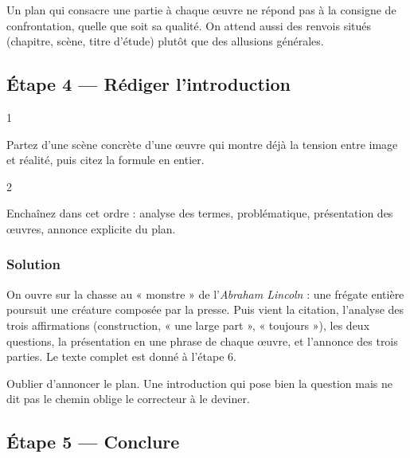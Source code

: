 \documentclass[11pt,a4paper]{article}
\begin{document}
\begin{jury}

Un plan qui consacre une partie à chaque œuvre ne répond pas à la consigne de confrontation, quelle que soit sa qualité. On attend aussi des renvois situés (chapitre, scène, titre d'étude) plutôt que des allusions générales.

\end{jury}

\hypertarget{uxe9tape-4-ruxe9diger-lintroduction}{%
\subsection{Étape 4 --- Rédiger l'introduction}\label{uxe9tape-4-ruxe9diger-lintroduction}}

\begin{indication}{1}

Partez d'une scène concrète d'une œuvre qui montre déjà la tension entre image et réalité, puis citez la formule en entier.

\end{indication}

\begin{indication}{2}

Enchaînez dans cet ordre : analyse des termes, problématique, présentation des œuvres, annonce explicite du plan.

\end{indication}

\hypertarget{solution-7}{%
\subsubsection{Solution}\label{solution-7}}

On ouvre sur la chasse au « monstre » de l'\emph{Abraham Lincoln} : une frégate entière poursuit une créature composée par la presse. Puis vient la citation, l'analyse des trois affirmations (construction, « une large part », « toujours »), les deux questions, la présentation en une phrase de chaque œuvre, et l'annonce des trois parties. Le texte complet est donné à l'étape 6.

\begin{piege}

Oublier d'annoncer le plan. Une introduction qui pose bien la question mais ne dit pas le chemin oblige le correcteur à le deviner.

\end{piege}

\hypertarget{uxe9tape-5-conclure}{%
\subsection{Étape 5 --- Conclure}\label{uxe9tape-5-conclure}}
\end{document}

